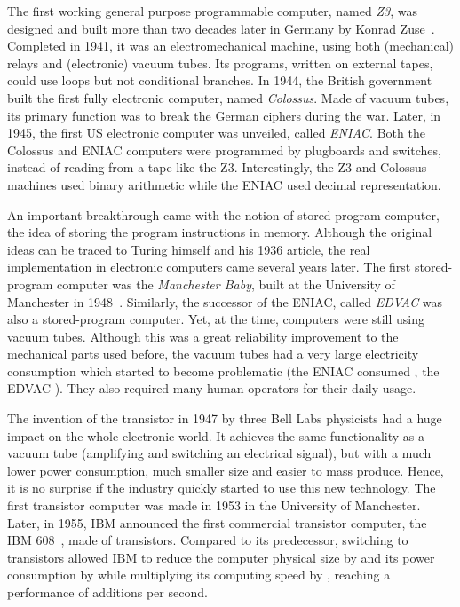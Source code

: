         The first working general purpose programmable computer, named \emph{Z3}, was designed and built more than two
        decades later in Germany by Konrad Zuse~\cite{sep-computing-history}. Completed in 1941, it was an
        electromechanical machine, using both (mechanical) relays and (electronic) vacuum tubes. Its programs, written
        on external tapes, could use loops but not conditional branches. In 1944, the British government built the first
        fully electronic computer, named \emph{Colossus}. Made of vacuum tubes, its primary function was to break the
        German ciphers during the war. Later, in 1945, the first US electronic computer was unveiled, called
        \emph{ENIAC}. Both the Colossus and ENIAC computers were programmed by plugboards and switches, instead of
        reading from a tape like the Z3. Interestingly, the Z3 and Colossus machines used binary arithmetic while the
        ENIAC used decimal representation.

        An important breakthrough came with the notion of stored-program computer, \ie the idea of storing the program
        instructions in memory. Although the original ideas can be traced to Turing himself and his 1936 article, the
        real implementation in electronic computers came several years later. The first stored-program computer was
        the \emph{Manchester Baby}, built at the University of Manchester in 1948~\cite{sep-computing-history}.
        Similarly, the successor of the ENIAC, called \emph{EDVAC} was also a stored-program computer. Yet, at the time,
        computers were still using vacuum tubes. Although this was a great reliability improvement to the mechanical
        parts used before, the vacuum tubes had a very large electricity consumption which started to become problematic
        (the ENIAC consumed , the EDVAC ). They also required many
        human operators for their daily usage.

        The invention of the transistor in 1947 by three Bell Labs physicists had a huge impact on the whole electronic
        world. It achieves the same functionality as a vacuum tube (amplifying and switching an electrical signal),
        but with a much lower power consumption, much smaller size and easier to mass produce. Hence, it is no
        surprise if the industry quickly started to use this new technology. The first transistor computer was made in
        1953 in the University of Manchester. Later, in 1955, IBM announced the first commercial transistor computer,
        the IBM 608~\cite{ibm608}, made of  transistors. Compared to its predecessor, switching to transistors
        allowed IBM to reduce the computer physical size by  and its power consumption by
         while multiplying its computing speed by , reaching a performance of 
        additions per second.

